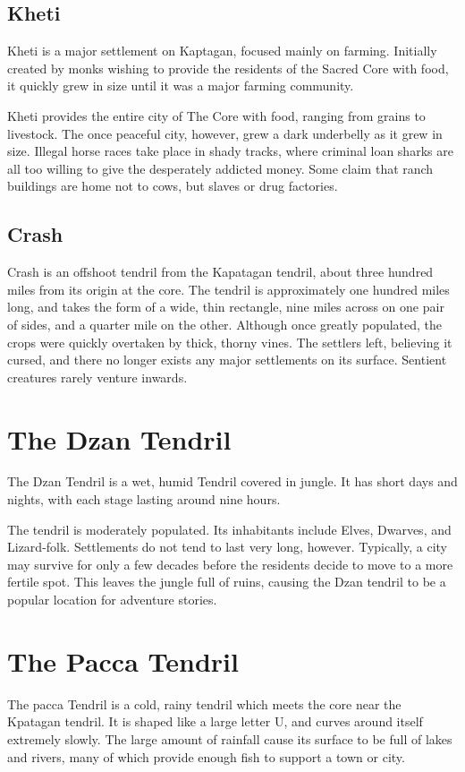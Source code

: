 \begin{multicols}{2}
\subsection{Kheti}
Kheti is a major settlement on Kaptagan, focused mainly on farming.
Initially created by monks wishing to provide the residents of the Sacred Core with food, it quickly grew in size until it was a major farming community.

Kheti provides the entire city of The Core with food, ranging from grains to livestock.
The once peaceful city, however, grew a dark underbelly as it grew in size.
Illegal horse races take place in shady tracks, where criminal loan sharks are all too willing to give the desperately addicted money.
Some claim that ranch buildings are home not to cows, but slaves or drug factories.

\subsection{Crash}
Crash is an offshoot tendril from the Kapatagan tendril, about three hundred miles from its origin at the core.
The tendril is approximately one hundred miles long, and takes the form of a wide, thin rectangle, nine miles across on one pair of sides, and a quarter mile on the other.
Although once greatly populated, the crops were quickly overtaken by thick, thorny vines.
The settlers left, believing it cursed, and there no longer exists any major settlements on its surface.
Sentient creatures rarely venture inwards.

\section{The Dzan Tendril}
The Dzan Tendril is a wet, humid Tendril covered in jungle.
It has short days and nights, with each stage lasting around nine hours.

The tendril is moderately populated.
Its inhabitants include Elves, Dwarves, and Lizard-folk.
Settlements do not tend to last very long, however.
Typically, a city may survive for only a few decades before the residents decide to move to a more fertile spot.
This leaves the jungle full of ruins, causing the Dzan tendril to be a popular location for adventure stories.
\section{The Pacca Tendril}
The pacca Tendril is a cold, rainy tendril which meets the core near the Kpatagan tendril.
It is shaped like a large letter U, and curves around itself extremely slowly.
The large amount of rainfall cause its surface to be full of lakes and rivers, many of which provide enough fish to support a town or city.


\end{multicols}
